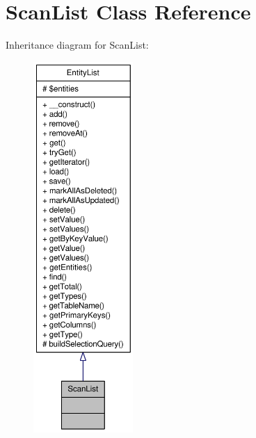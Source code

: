 \hypertarget{classScanList}{
\section{ScanList Class Reference}
\label{classScanList}
}


Inheritance diagram for ScanList:\nopagebreak
\begin{figure}[H]
\begin{center}
\leavevmode
\includegraphics[height=400pt]{classScanList__inherit__graph}
\end{center}
\end{figure}


